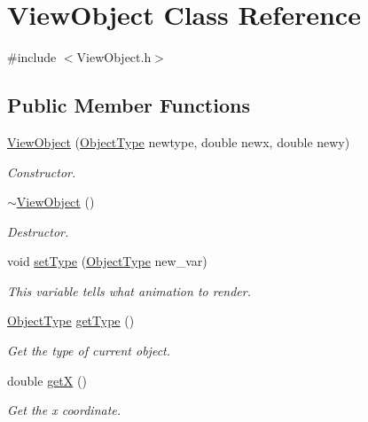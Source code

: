 \hypertarget{classViewObject}{\section{View\-Object Class Reference}
\label{classViewObject}
}


{\ttfamily \#include $<$View\-Object.\-h$>$}

\subsection*{Public Member Functions}
\begin{DoxyCompactItemize}
\item 
\hyperlink{classViewObject_af0967b283bea1626055db213a2fd8ff7}{View\-Object} (\hyperlink{BasicTypes_8h_a842c5e2e69277690b064bf363c017980}{Object\-Type} newtype, double newx, double newy)
\begin{DoxyCompactList}\small\item\em Constructor. \end{DoxyCompactList}\item 
\hyperlink{classViewObject_af4f968a145747cc2b84fd224ac72122b}{$\sim$\-View\-Object} ()
\begin{DoxyCompactList}\small\item\em Destructor. \end{DoxyCompactList}\item 
void \hyperlink{classViewObject_a6326cc5b3e2151479f8f57149d67bcd8}{set\-Type} (\hyperlink{BasicTypes_8h_a842c5e2e69277690b064bf363c017980}{Object\-Type} new\-\_\-var)
\begin{DoxyCompactList}\small\item\em This variable tells what animation to render. \end{DoxyCompactList}\item 
\hyperlink{BasicTypes_8h_a842c5e2e69277690b064bf363c017980}{Object\-Type} \hyperlink{classViewObject_a4036d3daa7bdd910dc0aa6c6bf5326c7}{get\-Type} ()
\begin{DoxyCompactList}\small\item\em Get the type of current object. \end{DoxyCompactList}\item 
double \hyperlink{classViewObject_a3bb8e2fe8dbd3860d0c3fbda48ad9aab}{get\-X} ()
\begin{DoxyCompactList}\small\item\em Get the x coordinate. \end{DoxyCompactList}\item 

\end{DoxyCompactItemize}
